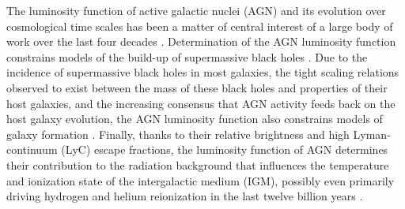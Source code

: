 \documentclass[fleqn,usenatbib]{mnras}
\begin{document}
The luminosity function of active galactic nuclei (AGN) and its
evolution over cosmological time scales has been a matter of central
interest of a large body of work over the last four decades
\citep{1978A&A....68...17M, 1983ApJ...269..352S, 1988ApJ...325...92K,
  1988MNRAS.235..935B, 1993ApJ...406L..43H, 1994ApJ...421..412W,
  1995AJ....110...68S, 1995AJ....110.2553K, 1995ApJ...438..623P,
  2000MNRAS.317.1014B, 2001AJ....121...54F, 2004AJ....128..515F,
  2006AJ....131.2766R, 2007ApJ...654..731H, 2009MNRAS.392...19C,
  2010AJ....139..906W, 2011ApJ...728L..26G, 2013ApJ...773...14R,
  2013ApJ...768..105M, 2015AA...578A..83G, 2015ApJ...798...28K,
  2016ApJ...829...33Y, 2016ApJ...833..222J}.  Determination of the AGN
luminosity function constrains models of the build-up of supermassive
black holes \citep{1982MNRAS.200..115S, 2004ApJ...602..603Y,
  2007ApJ...654..731H, 2008ApJ...679..118S, 2009A&A...493...55E,
  2000ApJ...531...42H, 2010MNRAS.401.2531A, 2013ApJ...773...14R,
  2014ApJ...787...73D, 2015MNRAS.448.3603D, 2015MNRAS.452..575S,
  2016MNRAS.462..190R}.  Due to the incidence of supermassive black
holes in most galaxies, the tight scaling relations observed to exist
between the mass of these black holes and properties of their host
galaxies, and the increasing consensus that AGN activity feeds back on
the host galaxy evolution, the AGN luminosity function also constrains
models of galaxy formation \citep{2006ApJ...650...42L,
  2008MNRAS.385.1846M}.  Finally, thanks to their relative brightness
and high Lyman-continuum (LyC) escape fractions, the luminosity
function of AGN determines their contribution to the radiation
background that influences the temperature and ionization state of the
intergalactic medium (IGM), possibly even primarily driving hydrogen
and helium reionization in the last twelve billion years
\citep{2012ApJ...746..125H, 2015AA...578A..83G, 2017ApJ...847L..15O,
  2018MNRAS.474.2904P, 2018arXiv180104931P}.
\end{document}
